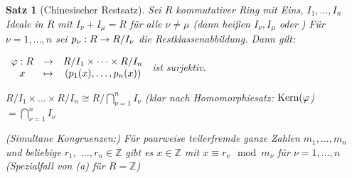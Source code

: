 \documentclass[a4paper,10pt,german]{scrbook}
\theoremstyle{saetze}
\newtheorem{Satz}{Satz}
\theoremstyle{definitionen}
\begin{document}
\begin{Satz}[Chinesischer Restsatz]
\label{Satz 8}
Sei $R$ kommutativer Ring mit Eins, $I_1,\dots,I_n$
Ideale in $R$ mit $I_\nu + I_\mu = R$ für alle $\nu \not= \mu$ (dann
heißen $I_\nu, I_\mu$  oder ) Für $\nu
= 1,\dots,n$ sei $p_\nu : R \rightarrow R/I_\nu$ die Restklassenabbildung.
Dann gilt:
\begin{enum}
\item $\begin{array}{ccc}\varphi: R &\rightarrow& R/I_1 \times \dots \times R/I_n \\
x &\mapsto& (p_1(x),\dots,p_n(x)) \end{array}$ ist surjektiv.

\item $R/I_1 \times \dots \times R/I_n \cong R/\bigcap_{\nu=1}^n
I_\nu$ (klar nach Homomorphiesatz: $\mathop{\rm Kern}\nolimits(\varphi$)$= \bigcap_{\nu =
1}^n I_\nu$
\item (Simultane Kongruenzen:) \newline Für paarweise teilerfremde ganze
Zahlen $m_1,\dots,m_n$ und beliebige $r_1,$ $\dots,r_n \in
\mathbb{Z}$ gibt es $x \in \mathbb{Z}$ mit $x \equiv r_\nu \mod
m_\nu$ für $\nu = 1,\dots,n$ (Spezialfall von (a) für
$R=\mathbb{Z}$) \end{enum} \noindent {}
\end{Satz}
\end{document}
